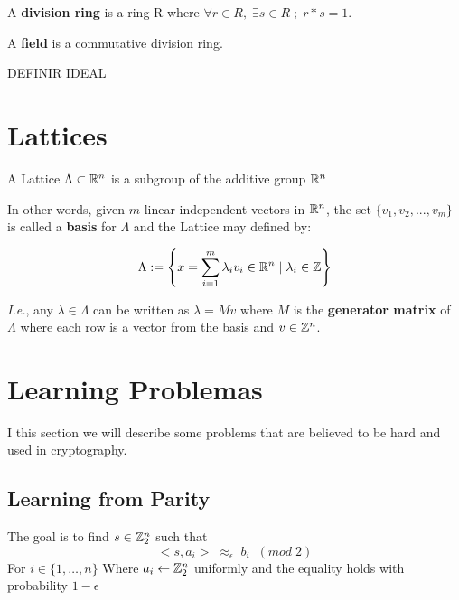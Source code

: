 \documentclass[Ingles]{ic-tese-v3}
\begin{document}
\begin{definition}
  A \textbf{division ring} is a ring R where $\forall r \in R, \; \exists s \in R \; ; \; r*s = 1$.
\end{definition}

\begin{definition}
  A \textbf{field} is a commutative division ring.
\end{definition}

DEFINIR IDEAL

\section{Lattices}
\label{sec:org2efa6bd}

   \begin{definition}
  A Lattice $\Lambda \subset \mathbb{R}^n$ is a subgroup of the additive group $\mathbb{R}^n$
\end{definition}

In other words, given \(m\) linear independent vectors in \(\mathbb{R}^n\), the set
\(\{v_1, v_2, ..., v_m\}\) is called a \textbf{basis} for \(\Lambda\) and the Lattice may defined
by:

\begin{definition}
  \begin{equation*}
    \Lambda := \left\{x = \sum_{i=1}^m{\lambda_iv_i} \in \mathbb{R}^n \; | \; \lambda_i \in \mathbb{Z}\right\}
  \end{equation*}

\emph{I.e.}, any $\lambda \in \Lambda$ can be written as $\lambda = Mv$ where $M$ is the
\textbf{generator matrix} of $\Lambda$ where each row is a vector from the basis and
$v \in \mathbb{Z}^n$.
\end{definition}

\section{Learning Problemas}
\label{sec:orgbde7bc7}
I this section we will describe some problems that are believed to be hard and used in cryptography. 
\subsection{Learning from Parity}
\label{sec:org87d8b45}

The goal is to find \(s \in \mathbb{Z}^n_2\) such that
$$ <s, a_i> \; \approx_\epsilon \; b_i \;\; (mod\; 2) $$
For \(i \in \{1,\dots,n\}\)
Where \(a_i \gets \mathbb{Z}^n_2\) uniformly and the equality holds with probability \(1 - \epsilon\)
\end{document}
